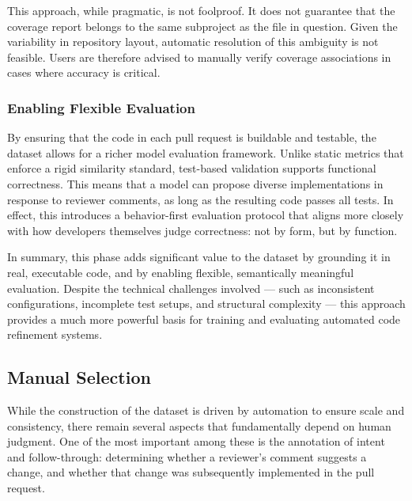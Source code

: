 This approach, while pragmatic, is not foolproof. It does not guarantee that the coverage report
belongs to the same subproject as the file in question. Given the variability in repository layout,
automatic resolution of this ambiguity is not feasible. Users are therefore advised to manually
verify coverage associations in cases where accuracy is critical.

\subsubsection{Enabling Flexible Evaluation}

By ensuring that the code in each pull request is buildable and testable, the dataset allows for a
richer model evaluation framework. Unlike static metrics that enforce a rigid similarity standard,
test-based validation supports functional correctness. This means that a model can propose diverse
implementations in response to reviewer comments, as long as the resulting code passes all tests. In
effect, this introduces a behavior-first evaluation protocol that aligns more closely with how
developers themselves judge correctness: not by form, but by function.

In summary, this phase adds significant value to the dataset by grounding it in real, executable
code, and by enabling flexible, semantically meaningful evaluation. Despite the technical challenges
involved — such as inconsistent configurations, incomplete test setups, and structural complexity —
this approach provides a much more powerful basis for training and evaluating automated code
refinement systems.

\subsection{Manual Selection}
\label{sec:manual-selection}

While the construction of the dataset is driven by automation to ensure scale and consistency, there
remain several aspects that fundamentally depend on human judgment. One of the most important among
these is the annotation of intent and follow-through: determining whether a reviewer’s comment
suggests a change, and whether that change was subsequently implemented in the pull request.

